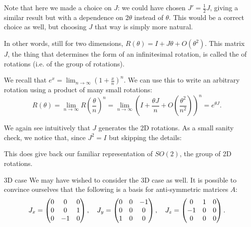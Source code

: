 \documentclass[a4paper]{article}
\begin{document}
\begin{parag}{}
    Note that here we made a choice on $J$: we could have chosen $J' = \frac{1}{2} J$, giving a similar result but with a dependence on $2\theta$ instead of $\theta$. This would be a correct choice as well, but choosing $J$ that way is simply more natural.

    In other words, still for two dimensions, $R\left(\theta\right) = I + J \theta + O\left(\theta^2\right)$. This matrix $J$, the thing that determines the form of an infinitesimal rotation, is called the  of rotations (i.e. of the group of rotations). 

    We recall that $e^x = \lim_{n \to \infty} \left(1 + \frac{x}{n}\right)^n$. We can use this to write an arbitrary rotation using a product of many small rotations: 
    \[R\left(\theta\right) = \lim_{n \to \infty} R\left(\frac{\theta}{n}\right)^n = \lim_{n \to \infty} \left(I + \frac{\theta J}{n} + O\left(\frac{\theta^2}{n^2}\right)\right)^n = e^{\theta J}.\]
    
    We again see intuitively that $J$ generates the 2D rotations. As a small sanity check, we notice that, since $J^2 = I$ but skipping the details: 

    This does give back our familiar representation of $SO\left(2\right)$, the group of 2D rotations.

    \begin{subparag}{3D case}
        We may have wished to consider the 3D case as well. It is possible to convince ourselves that the following is a basis for anti-symmetric matrices $A$:
        \[J_x = \begin{pmatrix} 0 & 0 & 0 \\ 0 & 0 & 1 \\ 0 & -1 & 0 \end{pmatrix}, \quad J_y = \begin{pmatrix} 0 & 0 & -1 \\ 0 & 0 & 0 \\ 1 & 0 & 0 \end{pmatrix}, \quad J_z = \begin{pmatrix} 0 & 1 & 0 \\ -1 & 0 & 0 \\ 0 & 0 & 0 \end{pmatrix}.\]


\end{subparag}
\end{parag}
\end{document}
